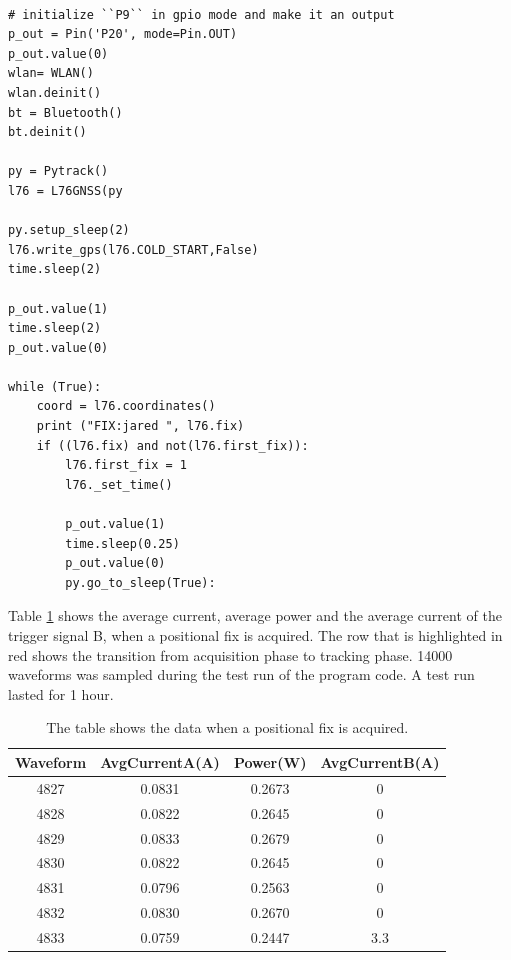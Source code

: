 \lstset{language=Python}          %
\begin{lstlisting}[frame=single, caption= main.py without communication]  % Start your code-block

# initialize ``P9`` in gpio mode and make it an output
p_out = Pin('P20', mode=Pin.OUT)
p_out.value(0)
wlan= WLAN()
wlan.deinit()
bt = Bluetooth()
bt.deinit()

py = Pytrack()
l76 = L76GNSS(py

py.setup_sleep(2)
l76.write_gps(l76.COLD_START,False)
time.sleep(2)

p_out.value(1)
time.sleep(2)
p_out.value(0)

while (True):
    coord = l76.coordinates()
    print ("FIX:jared ", l76.fix)
    if ((l76.fix) and not(l76.first_fix)):
        l76.first_fix = 1
        l76._set_time()

        p_out.value(1)
        time.sleep(0.25)
        p_out.value(0)
        py.go_to_sleep(True):
\end{lstlisting}
\label{code:wifioff}

Table \ref{Table:wifioff} shows the average current, average power and the average current of the trigger signal B, when a positional fix is acquired. The row that is highlighted in red shows the transition from acquisition phase to tracking phase. 14000 waveforms was sampled during the test run of the program code. A test run lasted for 1 hour.  


\begin{table}[h!]
\begin{center}
 \begin{tabular}{||c c c c||} 
 \hline
 Waveform & AvgCurrentA(A) & Power(W) & AvgCurrentB(A) \\ [0.5ex] 
 \hline\hline
 4827 & 0.0831 & 0.2673 & 0 \\
 \hline
 4828 & 0.0822 & 0.2645 & 0 \\
 \hline
 4829 & 0.0833 & 0.2679 & 0 \\
 \hline
 4830 & 0.0822 & 0.2645 & 0 \\
 \hline
 4831 & 0.0796 & 0.2563 & 0 \\ 
 \hline
 4832 & 0.0830 & 0.2670 & 0 \\
 \hline
 \rowcolor{red}
 4833 & 0.0759  & 0.2447 & 3.3 \\[1ex]
 \hline
\end{tabular}
\end{center}
\caption{The table shows the data when a positional fix is acquired.}
\label{Table:wifioff}
\end{table}

